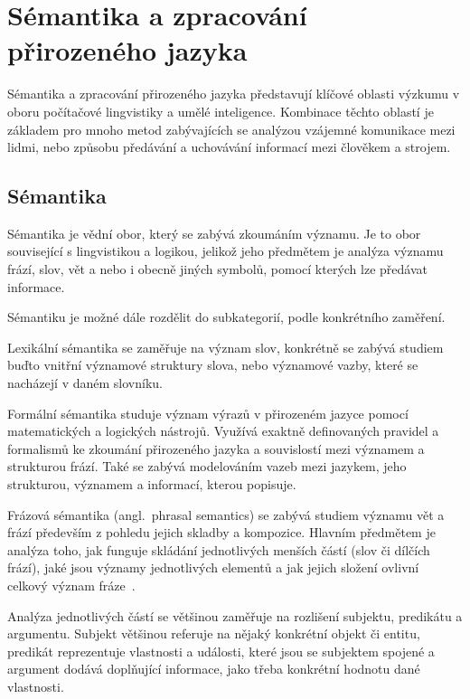 \clearpage
\section{Sémantika a zpracování přirozeného jazyka}
Sémantika a zpracování přirozeného jazyka představují klíčové oblasti výzkumu v oboru počítačové lingvistiky a umělé inteligence.
Kombinace těchto oblastí je základem pro mnoho metod zabývajících se analýzou vzájemné komunikace mezi lidmi,
nebo způsobu předávání a uchovávání informací mezi člověkem a strojem.

\subsection{Sémantika}
Sémantika je vědní obor, který se zabývá zkoumáním významu.
Je to obor související s lingvistikou a logikou, jelikož jeho předmětem je analýza významu frází, slov, vět a nebo i obecně jiných symbolů,
pomocí kterých lze předávat informace.~\cite{palmer1981semantics}

Sémantiku je možné dále rozdělit do subkategorií, podle konkrétního zaměření.

Lexikální sémantika se zaměřuje na význam slov, konkrétně se zabývá studiem buďto vnitřní významové struktury slova,
nebo významové vazby, které se nacházejí v daném slovníku.~\cite{lexical-semantics}

Formální sémantika studuje význam výrazů v přirozeném jazyce pomocí matematických a logických nástrojů.
Využívá exaktně definovaných pravidel a formalismů ke zkoumání přirozeného jazyka a souvislostí mezi významem a strukturou frází.
Také se zabývá modelováním vazeb mezi jazykem, jeho strukturou, významem a informací, kterou popisuje.~\cite{rajman2007speech, portner2008formal}

Frázová sémantika (angl.~phrasal semantics) se zabývá studiem významu vět a frází především z pohledu jejich skladby a kompozice.
Hlavním předmětem je analýza toho, jak funguje skládání jednotlivých menších částí (slov či dílčích frází),
jaké jsou významy jednotlivých elementů a jak jejich složení ovlivní celkový význam fráze~\cite{riemer2010introducing-semantic}.

Analýza jednotlivých částí se většinou zaměřuje na rozlišení subjektu, predikátu a argumentu.
Subjekt většinou referuje na nějaký konkrétní objekt či entitu, predikát reprezentuje vlastnosti a události, které jsou se subjektem spojené
a argument dodává doplňující informace, jako třeba konkrétní hodnotu dané vlastnosti.~\cite{fasold2006introduction}

